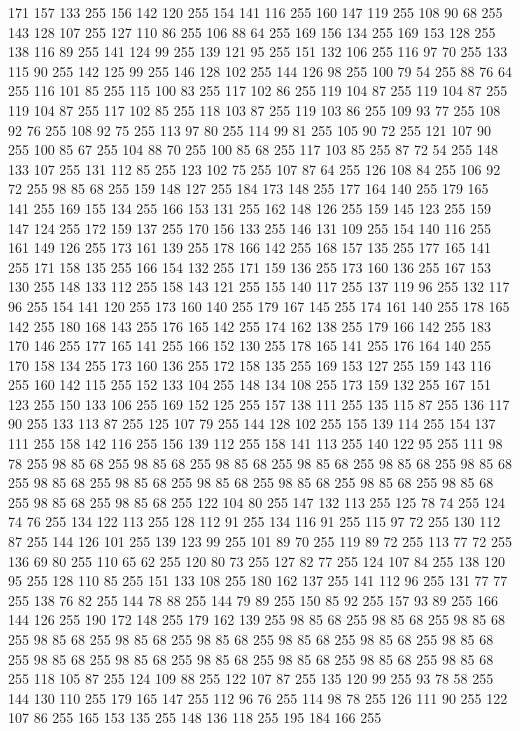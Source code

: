 171 157 133 255 156 142 120 255 154 141 116 255 160 147 119 255 108 90 68 255 143 128 107 255 127 110 86 255 106 88 64 255 169 156 134 255 169 153 128 255 138 116 89 255 141 124 99 255 139 121 95 255 151 132 106 255 116 97 70 255 133 115 90 255 142 125 99 255 146 128 102 255 144 126 98 255 100 79 54 255 88 76 64 255 116 101 85 255 115 100 83 255 117 102 86 255 119 104 87 255 119 104 87 255 119 104 87 255 117 102 85 255 118 103 87 255 119 103 86 255 109 93 77 255 108 92 76 255 108 92 75 255 113 97 80 255 114 99 81 255 105 90 72 255 121 107 90 255 100 85 67 255 104 88 70 255 100 85 68 255 117 103 85 255 87 72 54 255 148 133 107 255 131 112 85 255 123 102 75 255 107 87 64 255 126 108 84 255 106 92 72 255 98 85 68 255 159 148 127 255 184 173 148 255 177 164 140 255 179 165 141 255 169 155 134 255 166 153 131 255 162 148 126 255 159 145 123 255 159 147 124 255 172 159 137 255 170 156 133 255 146 131 109 255 154 140 116 255 161 149 126 255 173 161 139 255
178 166 142 255 168 157 135 255 177 165 141 255 171 158 135 255 166 154 132 255 171 159 136 255 173 160 136 255 167 153 130 255 148 133 112 255 158 143 121 255 155 140 117 255 137 119 96 255 132 117 96 255 154 141 120 255 173 160 140 255 179 167 145 255 174 161 140 255 178 165 142 255 180 168 143 255 176 165 142 255 174 162 138 255 179 166 142 255 183 170 146 255 177 165 141 255 166 152 130 255 178 165 141 255 176 164 140 255 170 158 134 255 173 160 136 255 172 158 135 255 169 153 127 255 159 143 116 255 160 142 115 255 152 133 104 255 148 134 108 255 173 159 132 255 167 151 123 255 150 133 106 255 169 152 125 255 157 138 111 255 135 115 87 255 136 117 90 255 133 113 87 255 125 107 79 255 144 128 102 255 155 139 114 255 154 137 111 255 158 142 116 255 156 139 112 255 158 141 113 255 140 122 95 255 111 98 78 255 98 85 68 255 98 85 68 255 98 85 68 255 98 85 68 255 98 85 68 255 98 85 68 255 98 85 68 255 98 85 68 255 98 85 68 255 98 85 68 255 98 85 68 255 98 85 68 255
98 85 68 255 98 85 68 255 122 104 80 255 147 132 113 255 125 78 74 255 124 74 76 255 134 122 113 255 128 112 91 255 134 116 91 255 115 97 72 255 130 112 87 255 144 126 101 255 139 123 99 255 101 89 70 255 119 89 72 255 113 77 72 255 136 69 80 255 110 65 62 255 120 80 73 255 127 82 77 255 124 107 84 255 138 120 95 255 128 110 85 255 151 133 108 255 180 162 137 255 141 112 96 255 131 77 77 255 138 76 82 255 144 78 88 255 144 79 89 255 150 85 92 255 157 93 89 255 166 144 126 255 190 172 148 255 179 162 139 255 98 85 68 255 98 85 68 255 98 85 68 255 98 85 68 255 98 85 68 255 98 85 68 255 98 85 68 255 98 85 68 255 98 85 68 255 98 85 68 255 98 85 68 255 98 85 68 255 98 85 68 255 98 85 68 255 98 85 68 255 118 105 87 255 124 109 88 255 122 107 87 255 135 120 99 255 93 78 58 255 144 130 110 255 179 165 147 255 112 96 76 255 114 98 78 255 126 111 90 255 122 107 86 255 165 153 135 255 148 136 118 255 195 184 166 255
